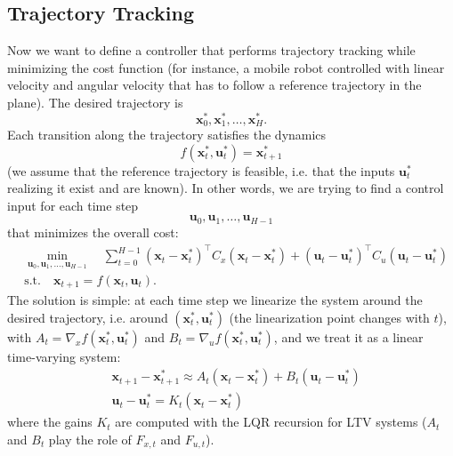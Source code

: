 \documentclass[10pt, a4paper]{report}
\begin{document}
\subsection{Trajectory Tracking}
Now we want to define a controller that performs trajectory tracking while minimizing the cost function (for instance, a mobile robot controlled with linear velocity and angular velocity that has to follow a reference trajectory in the plane). The desired trajectory is \begin{equation}
    \mathbf x_0^*,\mathbf x_1^*,\dots, \mathbf x_H^*.
\end{equation}
Each transition along the trajectory satisfies the dynamics\begin{equation}
    f( \mathbf x_t^*,\mathbf u_t^*)= \mathbf x_{t+1}^*
\end{equation}
(we assume that the reference trajectory is feasible, i.e. that the inputs $\mathbf u_t^*$ realizing it exist and are known). In other words, we are trying to find a control input for each time step\begin{equation}
    \mathbf u_0,\mathbf u_1,\dots,\mathbf u_{H-1}
\end{equation}
that minimizes the overall cost:\begin{align}
    &\operatorname*{\min}_{ \mathbf u_0,\mathbf u_1,\dots,\mathbf u_{H-1}}\quad\sum_{t=0}^{H-1}(\mathbf x_t-\mathbf x_t^*)^\top C_x (\mathbf x_t-\mathbf x_t^*)+(\mathbf u_t-\mathbf u_t^*)^\top C_u (\mathbf u_t-\mathbf u_t^*)\\ 
    &\text{s.t.}\quad \mathbf x_{t+1}=f(\mathbf x_t,\mathbf u_t).
\end{align}
The solution is simple: at each time step we linearize the system around the desired trajectory, i.e. around $(\mathbf x_t^*,\mathbf u_t^*)$ (the linearization point changes with $t$), with $A_t=\nabla_xf(\mathbf x_t^*,\mathbf u_t^*)$ and $B_t=\nabla_uf(\mathbf x_t^*,\mathbf u_t^*)$, and we treat it as a linear time-varying system:\begin{align}
    &\mathbf x_{t+1}-\mathbf x_{t+1}^*\approx A_t(\mathbf x_t-\mathbf x_t^*)+ B_t(\mathbf u_t-\mathbf u_t^*)\\
    &\mathbf u_t-\mathbf u_t^*=K_t(\mathbf x_t-\mathbf x_t^*)
\end{align}
where the gains $K_t$ are computed with the LQR recursion for LTV systems ($A_t$ and $B_t$ play the role of $F_{x,t}$ and $F_{u,t}$).
\end{document}
